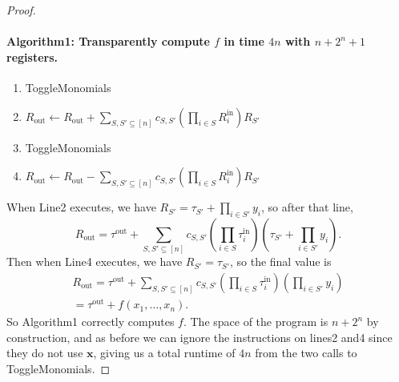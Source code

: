\begin{proof}
\paragraph{Algorithm1: Transparently compute $f$ in time $4n$ with $n+2^n+1$ registers.}
\begin{enumerate}[label=\arabic*:]
\item ToggleMonomials
\item $R_{\mathrm{out}}\leftarrow R_{\mathrm{out}}+\sum_{S,S'\subseteq[n]}c_{S,S'}(\prod_{i\in S}R_i^{\mathrm{in}})R_{S'}$
\item ToggleMonomials
\item $R_{\mathrm{out}}\leftarrow R_{\mathrm{out}}-\sum_{S,S'\subseteq[n]}c_{S,S'}(\prod_{i\in S}R_i^{\mathrm{in}})R_{S'}$
\end{enumerate}
When Line2 executes, we have $R_{S'}=\tau_{S'}+\prod_{i\in S'}y_i$, so after that line,
\[R_{\mathrm{out}}=\tau^{\mathrm{out}}+\sum_{S,S'\subseteq[n]}c_{S,S'}\left(\prod_{i\in S}\tau_i^{\mathrm{in}}\right)\left(\tau_{S'}+\prod_{i\in S'}y_i\right).\]
Then when Line4 executes, we have $R_{S'}=\tau_{S'}$, so the final value is
\begin{multline*}
R_{\mathrm{out}}=\tau^{\mathrm{out}}+\sum_{S,S'\subseteq[n]}c_{S,S'}\left(\prod_{i\in S}\tau_i^{\mathrm{in}}\right)\left(\prod_{i\in S'}y_i\right)\\
=\tau^{\mathrm{out}}+f(x_1,\ldots,x_n).
\end{multline*}
So Algorithm1 correctly computes $f$. The space of the program is $n+2^n$ by construction, and as before we can ignore the instructions on lines2 and4 since they do not use $\mathbf x$, giving us a total runtime of $4n$ from the two calls to ToggleMonomials.
\end{proof}
